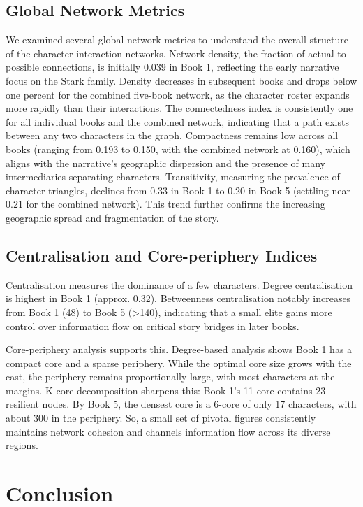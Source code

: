 \documentclass[12pt, a4paper]{article}
\begin{document}
	\subsection*{Global Network Metrics}
	We examined several global network metrics to understand the overall structure of the character interaction networks.
	Network {density}, the fraction of actual to possible connections, is initially 0.039 in Book 1, reflecting the early narrative focus on the Stark family. Density decreases in subsequent books and drops below one percent for the combined five-book network, as the character roster expands more rapidly than their interactions.
	The {connectedness} index is consistently one for all individual books and the combined network, indicating that a path exists between any two characters in the graph.
	{Compactness} remains low across all books (ranging from 0.193 to 0.150, with the combined network at 0.160), which aligns with the narrative's geographic dispersion and the presence of many intermediaries separating characters.
	{Transitivity}, measuring the prevalence of character triangles, declines from 0.33 in Book 1 to 0.20 in Book 5 (settling near 0.21 for the combined network). This trend further confirms the increasing geographic spread and fragmentation of the story.
	
	\subsection*{Centralisation and Core-periphery Indices}
	Centralisation measures the dominance of a few characters. Degree centralisation is highest in Book 1 (approx. 0.32). Betweenness centralisation notably increases from Book 1 (48) to Book 5 (>140), indicating that a small elite gains more control over information flow on critical story bridges in later books.

	Core-periphery analysis supports this. Degree-based analysis shows Book 1 has a compact core and a sparse periphery. While the optimal core size grows with the cast, the periphery remains proportionally large, with most characters at the margins. K-core decomposition sharpens this: Book 1's 11-core contains 23 resilient nodes. By Book 5, the densest core is a 6-core of only 17 characters, with about 300 in the periphery.
      So, a small set of pivotal figures consistently maintains network cohesion and channels information flow across its diverse regions.
	
	\section{Conclusion}
	\label{conclusion}
	
\end{document}
